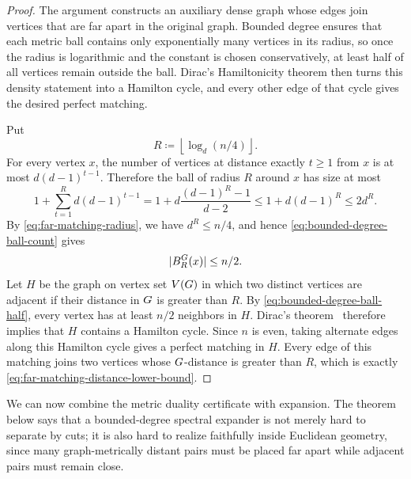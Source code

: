\begin{proof}
	The argument constructs an auxiliary dense graph whose edges join vertices that are far apart in the original graph. Bounded degree ensures that each metric ball contains only exponentially many vertices in its radius, so once the radius is logarithmic and the constant is chosen conservatively, at least half of all vertices remain outside the ball. Dirac's Hamiltonicity theorem then turns this density statement into a Hamilton cycle, and every other edge of that cycle gives the desired perfect matching.

	Put
	\begin{equation}
		\label{eq:far-matching-radius}
		R\coloneqq \left\lfloor \log_d(n/4)\right\rfloor.
	\end{equation}
	For every vertex \(x\), the number of vertices at distance exactly \(t\geq 1\) from \(x\) is at most \(d(d-1)^{t-1}\). Therefore the ball of radius \(R\) around \(x\) has size at most
	\begin{equation}
		\label{eq:bounded-degree-ball-count}
		1+\sum_{t=1}^{R}d(d-1)^{t-1}
		=
		1+d\frac{(d-1)^R-1}{d-2}
		\leq 1+d(d-1)^R
		\leq 2d^R.
	\end{equation}
	By \cref{eq:far-matching-radius}, we have \(d^R\leq n/4\), and hence \cref{eq:bounded-degree-ball-count} gives
	\begin{equation}
		\label{eq:bounded-degree-ball-half}
		\lvert B_R^{G}(x)\rvert\leq n/2.
	\end{equation}
	Let \(H\) be the graph on vertex set \(V(G)\) in which two distinct vertices are adjacent if their distance in \(G\) is greater than \(R\). By \cref{eq:bounded-degree-ball-half}, every vertex has at least \(n/2\) neighbors in \(H\). Dirac's theorem~\cite{Dir1952} therefore implies that \(H\) contains a Hamilton cycle. Since \(n\) is even, taking alternate edges along this Hamilton cycle gives a perfect matching in \(H\). Every edge of this matching joins two vertices whose \(G\)-distance is greater than \(R\), which is exactly \cref{eq:far-matching-distance-lower-bound}.
\end{proof}

We can now combine the metric duality certificate with expansion. The theorem below says that a bounded-degree spectral expander is not merely hard to separate by cuts; it is also hard to realize faithfully inside Euclidean geometry, since many graph-metrically distant pairs must be placed far apart while adjacent pairs must remain close.

